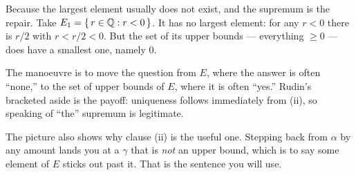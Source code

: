 \begin{unpack}
Because the largest element usually does not exist, and the supremum is the
repair. Take $E_1 = \{\, r \in \mathbb{Q} : r < 0 \,\}$. It has no largest element: for
any $r<0$ there is $r/2$ with $r < r/2 < 0$. But the set of its upper bounds ---
everything ${}\ge 0$ --- does have a smallest one, namely $0$.

The manoeuvre is to move the question from $E$, where the answer is often
``none,'' to the set of upper bounds of $E$, where it is often ``yes.'' Rudin's
bracketed aside is the payoff: uniqueness follows immediately from (ii), so
speaking of ``the'' supremum is legitimate.

\medskip
\begin{center}
\end{center}

\smallskip
The picture also shows why clause (ii) is the useful one. Stepping back from
$\alpha$ by any amount lands you at a $\gamma$ that is \emph{not} an upper
bound, which is to say some element of $E$ sticks out past it. That is the
sentence you will use.
\end{unpack}

